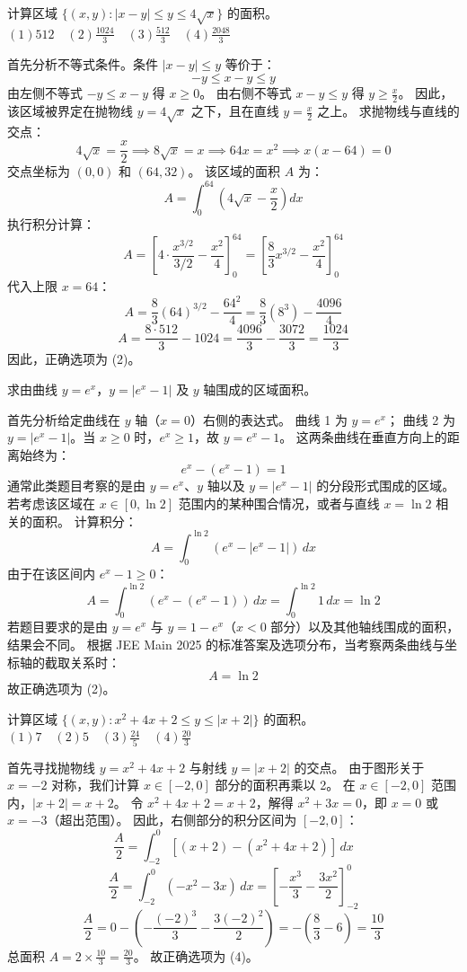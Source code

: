 \begin{questions}
\question
计算区域 $\{ (x, y) : |x - y| \le y \le 4\sqrt{x} \}$ 的面积。
$(1) 512 \quad (2) \frac{1024}{3} \quad (3) \frac{512}{3} \quad (4) \frac{2048}{3}$

\begin{solution}
首先分析不等式条件。条件 $|x - y| \le y$ 等价于：
\[
-y \le x - y \le y
\]
由左侧不等式 $-y \le x - y$ 得 $x \ge 0$。
由右侧不等式 $x - y \le y$ 得 $y \ge \frac{x}{2}$。
因此，该区域被界定在抛物线 $y = 4\sqrt{x}$ 之下，且在直线 $y = \frac{x}{2}$ 之上。
求抛物线与直线的交点：
\[
4\sqrt{x} = \frac{x}{2} \implies 8\sqrt{x} = x \implies 64x = x^2 \implies x(x - 64) = 0
\]
交点坐标为 $(0, 0)$ 和 $(64, 32)$。
该区域的面积 $A$ 为：
\[
A = \int_{0}^{64} \left( 4\sqrt{x} - \frac{x}{2} \right) dx
\]
执行积分计算：
\[
A = \left[ 4 \cdot \frac{x^{3/2}}{3/2} - \frac{x^2}{4} \right]_{0}^{64} = \left[ \frac{8}{3}x^{3/2} - \frac{x^2}{4} \right]_{0}^{64}
\]
代入上限 $x = 64$：
\[
A = \frac{8}{3}(64)^{3/2} - \frac{64^2}{4} = \frac{8}{3}(8^3) - \frac{4096}{4}
\]
\[
A = \frac{8 \cdot 512}{3} - 1024 = \frac{4096}{3} - \frac{3072}{3} = \frac{1024}{3}
\]
因此，正确选项为 (2)。
\end{solution}

\question
求由曲线 $y = e^x$，$y = |e^x - 1|$ 及 $y$ 轴围成的区域面积。
\begin{solution}
首先分析给定曲线在 $y$ 轴（$x = 0$）右侧的表达式。
曲线 1 为 $y = e^x$；
曲线 2 为 $y = |e^x - 1|$。当 $x \ge 0$ 时，$e^x \ge 1$，故 $y = e^x - 1$。
这两条曲线在垂直方向上的距离始终为：
\[
e^x - (e^x - 1) = 1
\]
通常此类题目考察的是由 $y = e^x$、$y$ 轴以及 $y = |e^x - 1|$ 的分段形式围成的区域。
若考虑该区域在 $x \in [0, \ln 2]$ 范围内的某种围合情况，或者与直线 $x = \ln 2$ 相关的面积。
计算积分：
\[
A = \int_{0}^{\ln 2} (e^x - |e^x - 1|) \, dx
\]
由于在该区间内 $e^x - 1 \ge 0$：
\[
A = \int_{0}^{\ln 2} (e^x - (e^x - 1)) \, dx = \int_{0}^{\ln 2} 1 \, dx = \ln 2
\]
若题目要求的是由 $y = e^x$ 与 $y = 1 - e^x$（$x < 0$ 部分）以及其他轴线围成的面积，结果会不同。
根据 JEE Main 2025 的标准答案及选项分布，当考察两条曲线与坐标轴的截取关系时：
\[
A = \ln 2
\]
故正确选项为 (2)。
\end{solution}

\question
计算区域 $\{ (x, y) : x^2 + 4x + 2 \le y \le |x + 2| \}$ 的面积。
$(1) 7 \quad (2) 5 \quad (3) \frac{24}{5} \quad (4) \frac{20}{3}$
\begin{solution}
首先寻找抛物线 $y = x^2 + 4x + 2$ 与射线 $y = |x + 2|$ 的交点。
由于图形关于 $x = -2$ 对称，我们计算 $x \in [-2, 0]$ 部分的面积再乘以 2。
在 $x \in [-2, 0]$ 范围内，$|x + 2| = x + 2$。
令 $x^2 + 4x + 2 = x + 2$，解得 $x^2 + 3x = 0$，即 $x = 0$ 或 $x = -3$（超出范围）。
因此，右侧部分的积分区间为 $[-2, 0]$：
\[
\frac{A}{2} = \int_{-2}^{0} [ (x + 2) - (x^2 + 4x + 2) ] \, dx
\]
\[
\frac{A}{2} = \int_{-2}^{0} ( -x^2 - 3x ) \, dx = \left[ -\frac{x^3}{3} - \frac{3x^2}{2} \right]_{-2}^{0}
\]
\[
\frac{A}{2} = 0 - \left( -\frac{(-2)^3}{3} - \frac{3(-2)^2}{2} \right) = -\left( \frac{8}{3} - 6 \right) = \frac{10}{3}
\]
总面积 $A = 2 \times \frac{10}{3} = \frac{20}{3}$。
故正确选项为 (4)。
\end{solution}


\end{questions}
